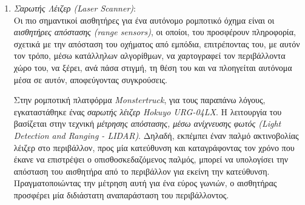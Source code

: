 \bigskip
\begin{enumerate}
\item \textit{Σαρωτής Λέιζερ (Laser Scanner)}:\\
Οι πιο σημαντικοί αισθητήρες για ένα αυτόνομο ρομποτικό όχημα είναι οι \textit{αισθητήρες απόστασης (range sensors)}, οι οποίοι, του προσφέρουν πληροφορία, σχετικά με την απόσταση του οχήματος από εμπόδια, επιτρέποντας του, με αυτόν τον τρόπο, μέσω κατάλληλων αλγορίθμων, να χαρτογραφεί τον περιβάλλοντα χώρο του, να ξέρει, ανά πάσα στιγμή, τη θέση του και να πλοηγείται αυτόνομα μέσα σε αυτόν, αποφεύγοντας συγκρούσεις. 

Στην ρομποτική πλατφόρμα \textit{Monstertruck}, για τους παραπάνω λόγους, εγκαταστάθηκε ένας \textit{σαρωτής λέιζερ Hokuyo URG-04LX}. Η λειτουργία του βασίζεται στην τεχνική \textit{μέτρησης απόστασης, μέσω ανίχνευσης φωτός (Light Detection and Ranging - LIDAR)}. Δηλαδή, εκπέμπει έναν παλμό ακτινοβολίας λέιζερ στο περιβάλλον, προς μία κατεύθυνση και καταγράφοντας τον χρόνο που έκανε να επιστρέψει ο οπισθοσκεδαζόμενος παλμός, μπορεί να υπολογίσει την απόσταση του αισθητήρα από το περιβάλλον για εκείνη την κατεύθυνση. Πραγματοποιώντας την μέτρηση αυτή για ένα εύρος γωνιών, ο αισθητήρας προσφέρει μία διδιάστατη αναπαράσταση του περιβάλλοντος. 


\end{enumerate}
